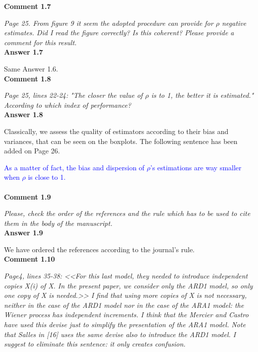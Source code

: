 { \bf Comment 1.7}

{\it Page 25. From figure 9 it seem the adopted procedure can provide for $\rho$  negative estimates. Did I read the figure correctly? Is this coherent?
Please provide a comment for this result.}\\
 
{ \bf Answer 1.7}

Same Answer 1.6.\\


{ \bf Comment 1.8}

{\it Page 25, lines 22-24: "The closer the value of $\rho$ is to 1, the better it is estimated." According to which index of performance?}\\
 
{ \bf Answer 1.8}

Classically, we assess the quality of estimators according to their bias and variances, that can be seen on the boxplots. The following sentence has been added on Page 26.

\textcolor{blue}{As a matter of fact, the bias and dispersion of $\rho$'s estimations are way smaller when $\rho$ is close to 1.} \\


\\

{ \bf Comment 1.9}

{\it Please, check the order of the references and the rule which has to be used to cite them in the body of the manuscript.}\\

{ \bf Answer 1.9}

We have ordered the references according to the journal's rule. \\

{ \bf Comment 1.10 }

{\it Page4, lines 35-38: <<For this last model, they needed to introduce independent copies X(i) of X. In the present paper,
we consider only the ARD1 model, so only one copy of X is needed.>>
I find that using more copies of X is not necessary, neither in the case of the ARD1 model nor in the case of the ARA1 model: the Wiener process has independent increments. I think that the Mercier and Castro have used this devise just to simplify the presentation of the ARA1 model. Note that Salles in [16] uses the same devise also to introduce the ARD1 model. I suggest to eliminate this sentence: it only creates confusion.}\\

